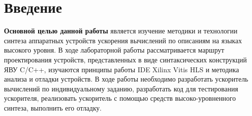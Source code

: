 \chapter*{Введение}

\textbf{Основной целью данной работы} является изучение методики и технологии синтеза аппаратных устройств ускорения вычислений по описаниям на языках высокого уровня. В ходе лабораторной работы рассматривается маршрут проектирования устройств, представленных в виде синтаксических конструкций ЯВУ C/C++, изучаются принципы работы IDE Xilinx Vitis HLS и методика анализа и отладки устройств. В ходе работы необходимо разработать ускоритель вычислений по индивидуальному заданию, разработать код для тестирования ускорителя, реализовать ускоритель с помощью средств высоко-уровненного синтеза, выполнить его отладку.
